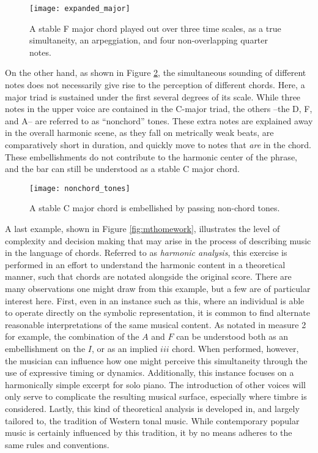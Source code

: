 \begin{figure}[t]
\centering
\texttt{[image: expanded\_major]}
\caption{A stable F major chord played out over three time scales, as a true simultaneity, an arpeggiation, and four non-overlapping quarter notes.}
\label{fig:expanded_major}
\end{figure}

On the other hand, as shown in Figure \ref{fig:nonchord_tones}, the simultaneous sounding of different notes does not necessarily give rise to the perception of different chords.
Here, a major triad is sustained under the first several degrees of its scale.
While three notes in the upper voice are contained in the C-major triad, the others --the D, F, and A-- are referred to as ``nonchord'' tones.
These extra notes are explained away in the overall harmonic scene, as they fall on metrically weak beats, are comparatively short in duration, and quickly move to notes that \emph{are} in the chord.
These embellishments do not contribute to the harmonic center of the phrase, and the bar can still be understood as a stable C major chord.

\begin{figure}[t]
\centering
\texttt{[image: nonchord\_tones]}
\caption{A stable C major chord is embellished by passing non-chord tones.}
\label{fig:nonchord_tones}
\end{figure}

A last example, shown in Figure \ref{fig:mthomework}, illustrates the level of complexity and decision making that may arise in the process of describing music in the language of chords.
Referred to as \emph{harmonic analysis}, this exercise is performed in an effort to understand the harmonic content in a theoretical manner, such that chords are notated alongside the original score.
There are many observations one might draw from this example, but a few are of particular interest here.
First, even in an instance such as this, where an individual is able to operate directly on the symbolic representation, it is common to find alternate reasonable interpretations of the same musical content.
As notated in measure 2 for example, the combination of the $A$ and $F$ can be understood both as an embellishment on the $I$, or as an implied $iii$ chord.
When performed, however, the musician can influence how one might perceive this simultaneity through the use of expressive timing or dynamics.
Additionally, this instance focuses on a harmonically simple excerpt for solo piano.
The introduction of other voices will only serve to complicate the resulting musical surface, especially where timbre is considered.
Lastly, this kind of theoretical analysis is developed in, and largely tailored to, the tradition of Western tonal music.
While contemporary popular music is certainly influenced by this tradition, it by no means adheres to the same rules and conventions.

